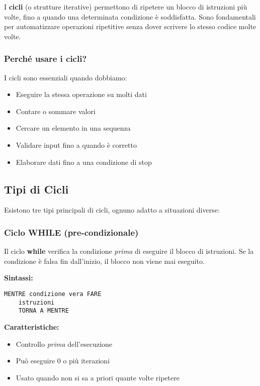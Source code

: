 \documentclass[a4paper,16pt]{article}
\begin{document}
I \textbf{cicli} (o strutture iterative) permettono di ripetere un blocco di istruzioni più volte, fino a quando una determinata condizione è soddisfatta. Sono fondamentali per automatizzare operazioni ripetitive senza dover scrivere lo stesso codice molte volte.

\subsubsection{Perché usare i cicli?}

I cicli sono essenziali quando dobbiamo:
\begin{itemize}[leftmargin=*]
    \item Eseguire la stessa operazione su molti dati
    \item Contare o sommare valori
    \item Cercare un elemento in una sequenza
    \item Validare input fino a quando è corretto
    \item Elaborare dati fino a una condizione di stop
\end{itemize}

\subsection{Tipi di Cicli}

Esistono tre tipi principali di cicli, ognuno adatto a situazioni diverse:

\subsubsection{Ciclo WHILE (pre-condizionale)}

Il ciclo \textbf{while} verifica la condizione \textit{prima} di eseguire il blocco di istruzioni. Se la condizione è falsa fin dall'inizio, il blocco non viene mai eseguito.

\textbf{Sintassi:}
\begin{lstlisting}
MENTRE condizione vera FARE
    istruzioni
    TORNA A MENTRE
\end{lstlisting}

\textbf{Caratteristiche:}
\begin{itemize}[leftmargin=*]
    \item Controllo \textit{prima} dell'esecuzione
    \item Può eseguire 0 o più iterazioni
    \item Usato quando non si sa a priori quante volte ripetere
\end{itemize}
\end{document}
